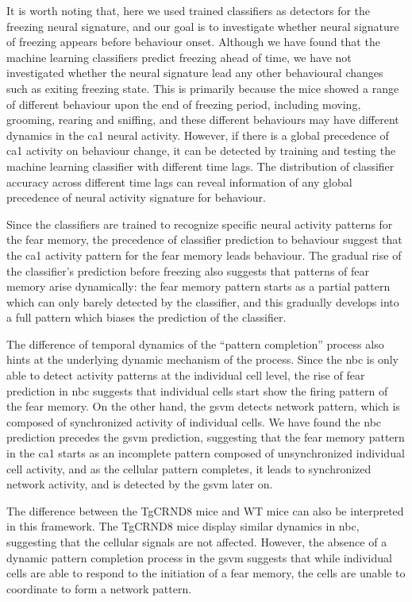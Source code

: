 It is worth noting that, here we used trained classifiers as detectors for the freezing neural signature, and our goal is to investigate whether neural signature of freezing appears before behaviour onset. Although we have found that the machine learning classifiers predict freezing ahead of time, we have not investigated whether the neural signature lead any other behavioural changes such as exiting freezing state. This is primarily because the mice showed a range of different behaviour upon the end of freezing period, including moving, grooming, rearing and sniffing, and these different behaviours may have different dynamics in the \gls{ca1} neural activity. However, if there is a global precedence of \gls{ca1} activity on behaviour change, it can be detected by training and testing the machine learning classifier with different time lags. The distribution of classifier accuracy across different time lags can reveal information of any global precedence of neural activity signature for behaviour. 

Since the classifiers are trained to recognize specific neural activity patterns for the fear memory, the precedence of classifier prediction to behaviour suggest that the \gls{ca1} activity pattern for the fear memory leads behaviour. The gradual rise of the classifier's prediction before freezing also suggests that patterns of fear memory arise dynamically: the fear memory pattern starts as a partial pattern which can only barely detected by the classifier, and this gradually develops into a full pattern which biases the prediction of the classifier. 

The difference of temporal dynamics of the ``pattern completion'' process also hints at the underlying dynamic mechanism of the process. Since the \gls{nbc} is only able to detect activity patterns at the individual cell level, the rise of fear prediction in \gls{nbc} suggests that individual cells start show the firing pattern of the fear memory. On the other hand, the \gls{gsvm} detects network pattern, which is composed of synchronized activity of individual cells. We have found the \gls{nbc} prediction precedes the \gls{gsvm} prediction, suggesting that the fear memory pattern in the \gls{ca1} starts as an incomplete pattern composed of unsynchronized individual cell activity, and as the cellular pattern completes, it leads to synchronized network activity, and is detected by the \gls{gsvm} later on. 

The difference between the TgCRND8 mice and WT mice can also be interpreted in this framework. The TgCRND8 mice display similar dynamics in \gls{nbc}, suggesting that the cellular signals are not affected. However, the absence of a dynamic pattern completion process in the \gls{gsvm} suggests that while individual cells are able to respond to the initiation of a fear memory, the cells are unable to coordinate to form a network pattern. 


